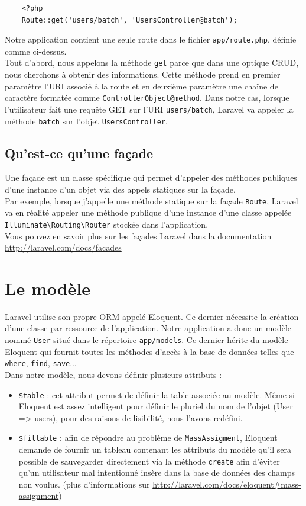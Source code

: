 	\begin{verbatim}
	<?php
	Route::get('users/batch', 'UsersController@batch');
	\end{verbatim}
	Notre application contient une seule route dans le fichier \verb|app/route.php|, définie comme ci-dessus.\\

	Tout d'abord, nous appelons la méthode \verb|get| parce que dans une optique CRUD, nous cherchons à obtenir des informations. Cette méthode prend en premier paramètre l'URI associé à la route et en deuxième paramètre une chaîne de caractère  formatée comme \verb|ControllerObject@method|. Dans notre cas, lorsque l'utilisateur fait une requête GET sur l'URI \verb|users/batch|, Laravel va appeler la méthode \verb|batch| sur l'objet \verb|UsersController|.

	\subsection{Qu'est-ce qu'une façade}
		Une façade est un classe spécifique qui permet d'appeler des méthodes publiques d'une instance d'un objet via des appels statiques sur la façade.\\

		Par exemple, lorsque j'appelle une méthode statique sur la façade \verb|Route|, Laravel va en réalité appeler une méthode publique d'une instance d'une classe appelée \verb|Illuminate\Routing\Router| stockée dans l'application.\\

		Vous pouvez en savoir plus sur les façades Laravel dans la documentation \url{http://laravel.com/docs/facades}

\section{Le modèle}
	Laravel utilise son propre ORM appelé Eloquent. Ce dernier nécessite la création d'une classe par ressource de l'application. Notre application a donc un modèle nommé \verb|User| situé dans le répertoire \verb|app/models|. Ce dernier hérite du modèle Eloquent qui fournit toutes les méthodes d'accès à la base de données telles que \verb|where|, \verb|find|, \verb|save|...\\

	Dans notre modèle, nous devons définir plusieurs attributs :
	\begin{itemize}
		\item \verb|$table| : cet attribut permet de définir la table associée au modèle. Même si Eloquent est assez intelligent pour définir le pluriel du nom de l'objet (User => users), pour des raisons de lisibilité, nous l'avons redéfini.
		\item \verb|$fillable| : afin de répondre au problème de \verb|MassAssigment|, Eloquent demande de fournir un tableau contenant les attributs du modèle qu'il sera possible de sauvegarder directement via la méthode \verb|create| afin d'éviter qu'un utilisateur mal intentionné insère dans la base de données des champs non voulus. (plus d'informations sur \url{http://laravel.com/docs/eloquent#mass-assignment})
	\end{itemize}

